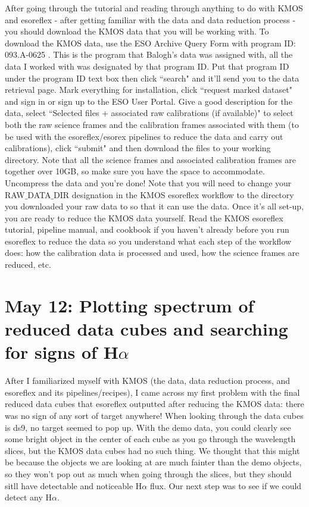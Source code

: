 \documentclass[10pt,letterpaper]{article}
\begin{document}
After going through the tutorial and reading through anything to do with KMOS and esoreflex - after getting familiar with the data and data reduction process - you should download the KMOS data that you will be working with. To download the KMOS data, use the ESO Archive Query Form \cite{ESO Archive Query Form} with program ID: 093.A-0625 . This is the program that Balogh's data was assigned with, all the data I worked with was designated by that program ID. Put that program ID under the program ID text box then click ``search" and it'll send you to the data retrieval page. Mark everything for installation, click ``request marked dataset" and sign in or sign up to the ESO User Portal. Give a good description for the data, select ``Selected files + associated raw calibrations (if available)" to select both the raw science frames and the calibration frames associated with them (to be used with the esoreflex/esorex pipelines to reduce the data and carry out calibrations), click ``submit" and then download the files to your working directory. Note that all the science frames and associated calibration frames are together over 10GB, so make sure you have the space to accommodate. Uncompress the data and you're done! Note that you will need to change your RAW$\_$DATA$\_$DIR designation in the KMOS esoreflex workflow to the directory you downloaded your raw data to so that it can use the data. Once it's all set-up, you are ready to reduce the KMOS data yourself. Read the KMOS esoreflex tutorial, pipeline manual, and cookbook if you haven't already before you run esoreflex to reduce the data so you understand what each step of the workflow does: how the calibration data is processed and used, how the science frames are reduced, etc. \\

\section{May 12: Plotting spectrum of reduced data cubes and searching for signs of H$\alpha$}
After I familiarized myself with KMOS (the data, data reduction process, and esoreflex and its pipelines/recipes), I came across my first problem with the final reduced data cubes that esoreflex outputted after reducing the KMOS data: there was no sign of any sort of target anywhere! When looking through the data cubes is ds9, no target seemed to pop up. With the demo data, you could clearly see some bright object in the center of each cube as you go through the wavelength slices, but the KMOS data cubes had no such thing. We thought that this might be because the objects we are looking at are much fainter than the demo objects, so they won't pop out as much when going through the slices, but they should sitll have detectable and noticeable H$\alpha$ flux. Our next step was to see if we could detect any H$\alpha$.\\
\end{document}
